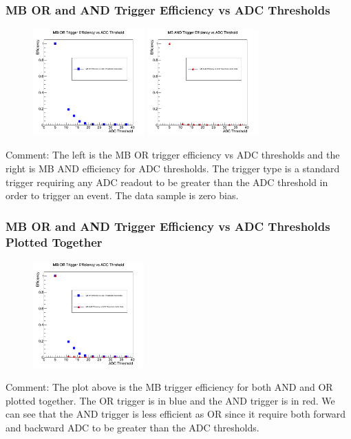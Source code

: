 \documentclass{beamer}
\begin{document}
\begin{frame}
\frametitle{MB OR and AND Trigger Efficiency vs ADC Thresholds}

\begin{figure}
\includegraphics[width=0.38\textwidth]{Plots/MBOREfficiency.png}
\includegraphics[width=0.38\textwidth]{Plots/MBANDEfficiency}
\end{figure}

\begin{block}
{Comment: The left is the MB OR trigger efficiency vs ADC thresholds and the right is MB AND efficiency for ADC thresholds. The trigger type is a standard trigger requiring any ADC readout to be greater than the ADC threshold in order to trigger an event. The data sample is zero bias.}
\end{block}
\end{frame}


\begin{frame}
\frametitle{MB OR and AND Trigger Efficiency vs ADC Thresholds Plotted Together}

\begin{figure}
\includegraphics[width=0.38\textwidth]{Plots/MBEfficiencyBoth.png}

\end{figure}

\begin{block}
{Comment: The plot above is the MB trigger efficiency for both AND and OR plotted together. The OR trigger is in blue and the AND trigger is in red. We can see that the AND trigger is less efficient as OR since it require both forward and backward ADC to be greater than the ADC thresholds.}
\end{block}
\end{frame}
\end{document}
